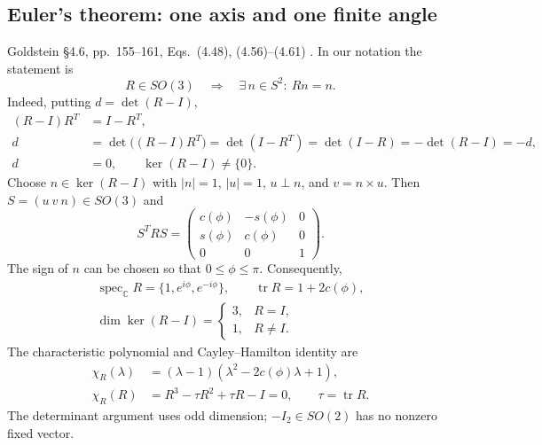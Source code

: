 \subsection{Euler's theorem: one axis and one finite angle}
\label{gnc:sec:euler-theorem}
Goldstein \S4.6, pp.~155--161, Eqs.~(4.48), (4.56)--(4.61)
\cite{dgdt:GPS2001}. In our notation the statement is
\[
 R\in SO(3)\quad\Longrightarrow\quad
 \exists\,n\in S^2:\ Rn=n.
\]
Indeed, putting $d=\det(R-I)$,
\begin{align*}
 (R-I)R^T&=I-R^T,\\
 d&=\det\bigl((R-I)R^T\bigr)
   =\det(I-R^T)=\det(I-R)=-\det(R-I)=-d,\\
 d&=0,\qquad \ker(R-I)\ne\{0\}.
\end{align*}
Choose $n\in\ker(R-I)$ with $|n|=1$, $|u|=1$, $u\perp n$, and
$v=n\times u$. Then $S=(u\ v\ n)\in SO(3)$ and
\begin{equation}\label{gnc:rotation-normal-form}
 S^TRS=\begin{pmatrix}c(\phi)&-s(\phi)&0\\s(\phi)&c(\phi)&0\\0&0&1\end{pmatrix}.
\end{equation}
The sign of $n$ can be chosen so that $0\le\phi\le\pi$.
Consequently,
\begin{equation}\label{gnc:rotation-spectrum}
 \begin{gathered}
 \operatorname{spec}_{\mathbb C}R=\{1,e^{i\phi},e^{-i\phi}\},\qquad
 \operatorname{tr}R=1+2c(\phi),\\
 \dim\ker(R-I)=\begin{cases}3,&R=I,\\1,&R\ne I.\end{cases}
 \end{gathered}
\end{equation}
The characteristic polynomial and Cayley--Hamilton identity are
\begin{equation}\label{gnc:rotation-cayley-hamilton}
 \begin{aligned}
 \chi_R(\lambda)&=(\lambda-1)(\lambda^2-2c(\phi)\lambda+1),\\
 \chi_R(R)&=R^3-\tau R^2+\tau R-I=0,\qquad\tau=\operatorname{tr}R.
 \end{aligned}
\end{equation}
The determinant argument uses odd dimension; $-I_2\in SO(2)$ has no
nonzero fixed vector.

